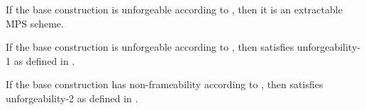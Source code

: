 \begin{theorem}
  If the base \CUASGen construction is unforgeable according to
  , then it is an extractable MPS scheme.
\end{theorem}

\begin{theorem}
  If the base \CUASGen construction is unforgeable according to
  , then \CUASMPS satisfies unforgeability-1 as
  defined in \cite{ngsy22}.
\end{theorem}

\begin{theorem}
  If the base \CUASGen construction has non-frameability according to
  , then \CUASMPS satisfies unforgeability-2 as
  defined in \cite{ngsy22}.
\end{theorem}

